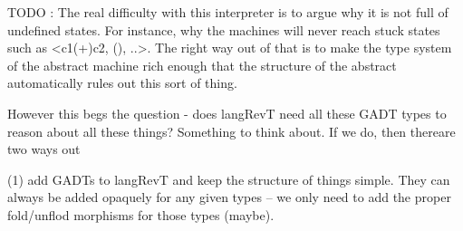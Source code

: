 \documentclass{llncs}
\begin{document}
\begin{center}
\end{center}



TODO : The real difficulty with this interpreter is to argue why it is
not full of undefined states. For instance, why the machines will
never reach stuck states such as {{<c1(+)c2, (), ..>}}.  The right way
out of that is to make the type system of the abstract machine rich
enough that the structure of the abstract automatically rules out this
sort of thing. 

%
%
%


However this begs the question - does {{langRevT}} need all these GADT
types to reason about all these things? Something to think about. If
we do, then thereare two ways out 

(1) add GADTs to {{langRevT}} and keep the structure of things
simple. They can always be added opaquely for any given types -- we
only need to add the proper fold/unflod morphisms for those types
(maybe).
\end{document}
